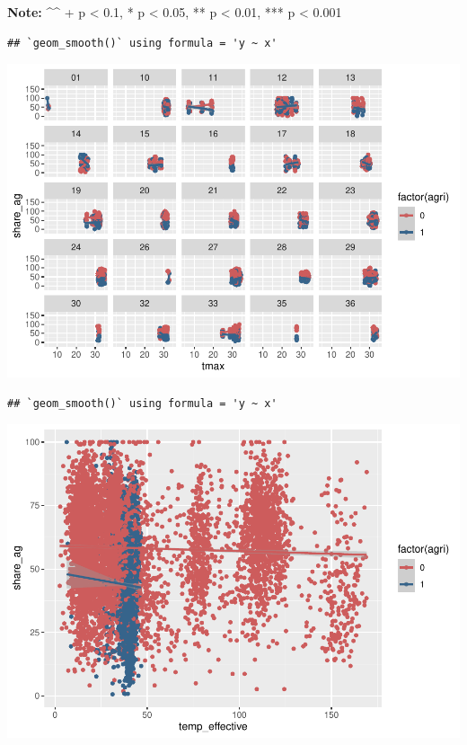 \documentclass[
]{article}
\begin{document}
\textbf{Note:} \^{}\^{} + p \textless{} 0.1, * p \textless{} 0.05, ** p
\textless{} 0.01, *** p \textless{} 0.001

\begin{verbatim}
## `geom_smooth()` using formula = 'y ~ x'
\end{verbatim}

\includegraphics{09panel-regs_files/figure-latex/unnamed-chunk-9-1.pdf}

\begin{verbatim}
## `geom_smooth()` using formula = 'y ~ x'
\end{verbatim}

\includegraphics{09panel-regs_files/figure-latex/unnamed-chunk-9-2.pdf}
\end{document}
